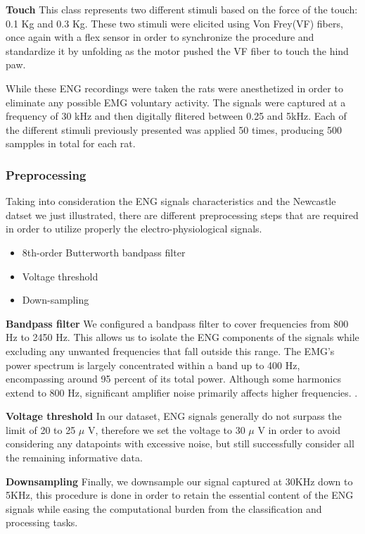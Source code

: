 \documentclass{Configuration_Files/PoliMi3i_thesis}
\begin{document}
\textbf{Touch} \quad This class represents two different stimuli based on the force of the touch: 0.1 Kg and 0.3 Kg.
These two stimuli were elicited using Von Frey(VF) fibers, once again with a flex sensor in order to synchronize the procedure and standardize it by unfolding as the motor pushed the VF fiber to touch the hind paw.

While these ENG recordings were taken the rats were anesthetized in order to eliminate any possible EMG voluntary activity. The signals were captured at a frequency of 30 kHz and then digitally flitered between 0.25 and 5kHz.
Each of the different stimuli previously presented was applied 50 times, producing 500 sampples in total for each rat. \cite{tesiDavide}

\subsubsection{Preprocessing}

Taking into consideration the ENG signals characteristics and the Newcastle datset we just illustrated, there are different preprocessing steps that are required in order to utilize properly the electro-physiological signals.

\begin{itemize}
	\item 8th-order Butterworth bandpass filter
	\item Voltage threshold
	\item Down-sampling
\end{itemize}

\textbf{Bandpass filter} \quad We configured a bandpass filter to cover frequencies from 800 Hz to 2450 Hz. This allows us to isolate the ENG components of the signals while excluding any unwanted frequencies that fall outside this range. The EMG's power spectrum is largely concentrated within a band up to 400 Hz, encompassing around 95 percent of its total power. Although some harmonics extend to 800 Hz, significant amplifier noise primarily affects higher frequencies. \cite{tesiDavide}\cite{tesiDavide5}.

\textbf{Voltage threshold} \quad In our dataset, ENG signals generally do not surpass the limit of 20 to 25 \(\mu \) V, therefore we set the voltage to 30 \(\mu \) V in order to avoid considering any datapoints with excessive noise, but still successfully consider all the remaining informative data.

\textbf{Downsampling} \quad Finally, we downsample our signal captured at 30KHz down to 5KHz, this procedure is done in order to retain the essential content of the ENG signals while easing the computational burden from the classification and processing tasks.
\end{document}
